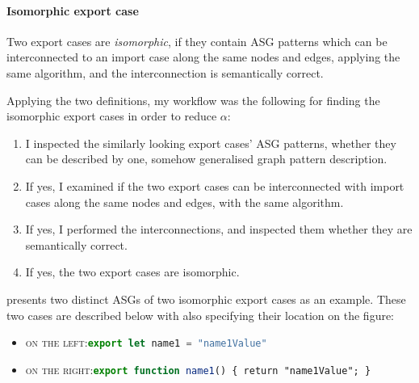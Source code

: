 \paragraph{Isomorphic export case}

Two export cases are \emph{isomorphic}, if they contain ASG patterns which can be interconnected to an import case along the same nodes and edges, applying the same algorithm, and the interconnection is semantically correct.

Applying the two definitions, my workflow was the following for finding the isomorphic export cases in order to reduce $\alpha$:

\begin{enumerate}
\item I inspected the similarly looking export cases' ASG patterns, whether they can be described by one, somehow generalised graph pattern description.
\item If yes, I examined if the two export cases can be interconnected with import cases along the same nodes and edges, with the same algorithm.
\item If yes, I performed the interconnections, and inspected them whether they are semantically correct.
\item If yes, the two export cases are isomorphic.
\end{enumerate}

 presents two distinct ASGs of two isomorphic export cases as an example. These two cases are described below with also specifying their location on the figure:
\begin{itemize}
\item \textsc{on the left:}\enskip\lstinline[language=JavaScript]{export let name1 = "name1Value"}
\item \textsc{on the right:}\enskip\lstinline[language=JavaScript]{export function name1()}\texttt{ \{ }\lstinline{return "name1Value";}\texttt{ \}}
\end{itemize}


